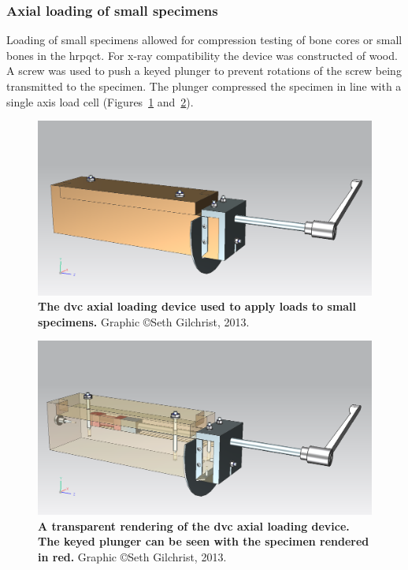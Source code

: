 \subsubsection{Axial loading of small specimens}
\label{sec:dvc_apparatus_axial}
Loading of small specimens allowed for compression testing of bone cores or small bones in the \ac{hrpqct}.
For x-ray compatibility the device was constructed of wood.
A screw was used to push a keyed plunger to prevent rotations of the screw being transmitted to the specimen.
The plunger compressed the specimen in line with a single axis load cell (Figures~\ref{fig:squareAsm} and~\ref{fig:squareAsmClear}).

\begin{figure}
\centering
\includegraphics[width=0.7\linewidth]{./appendixDvc/figures/squareAsm}
\caption[\acs*{dvc} axial loading device]{\textbf{The \acs*{dvc} axial loading device used to apply loads to small specimens.} Graphic \copyright Seth Gilchrist, 2013.}
\label{fig:squareAsm}
\end{figure}

\begin{figure}
\centering
\includegraphics[width=0.7\linewidth]{./appendixDvc/figures/squareAsmClear}
\caption[\acs*{dvc} axial loading device transparent]{\textbf{A transparent rendering of the \acs*{dvc} axial loading device. The keyed plunger can be seen with the specimen rendered in red.} Graphic \copyright Seth Gilchrist, 2013.}
\label{fig:squareAsmClear}
\end{figure}

